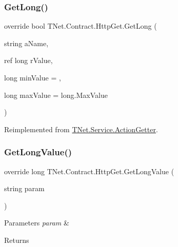 \subsubsection{\texorpdfstring{Get\+Long()}{GetLong()}}
{\footnotesize\ttfamily override bool T\+Net.\+Contract.\+Http\+Get.\+Get\+Long (\begin{DoxyParamCaption}\item[{string}]{a\+Name,  }\item[{ref long}]{r\+Value,  }\item[{long}]{min\+Value = {},  }\item[{long}]{max\+Value = {\ttfamily long.MaxValue} }\end{DoxyParamCaption})\hspace{0.3cm}{\ttfamily [virtual]}}







Reimplemented from \mbox{\hyperlink{class_t_net_1_1_service_1_1_action_getter_aeb35984a4c45e670f876bea9cb450563}{T\+Net.\+Service.\+Action\+Getter}}.

\mbox{\label{class_t_net_1_1_contract_1_1_http_get_abc50337872a82cb2ae04e19d3fc5032a}} 
\subsubsection{\texorpdfstring{Get\+Long\+Value()}{GetLongValue()}\hspace{0.1cm}{\footnotesize\ttfamily [1/2]}}
{\footnotesize\ttfamily override long T\+Net.\+Contract.\+Http\+Get.\+Get\+Long\+Value (\begin{DoxyParamCaption}\item[{string}]{param }\end{DoxyParamCaption})\hspace{0.3cm}{\ttfamily [virtual]}}






\begin{DoxyParams}{Parameters}
{\em param} & \\
\hline
\end{DoxyParams}
\begin{DoxyReturn}{Returns}

\end{DoxyReturn}


